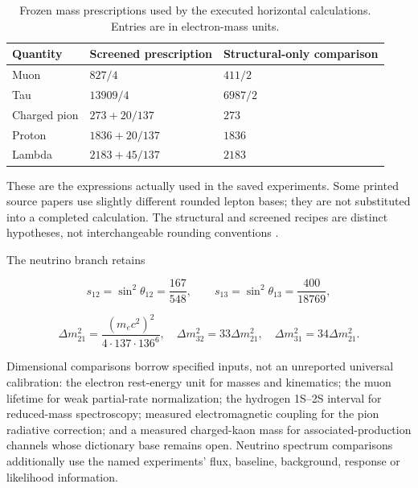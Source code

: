 \documentclass[11pt,a4paper]{article}
\begin{document}
\begin{table}[htbp]\centering
\caption{Frozen mass prescriptions used by the executed horizontal calculations. Entries are in electron-mass units.}\label{tab:dictionary}
\small\setlength{\tabcolsep}{5pt}\renewcommand{\arraystretch}{1.15}
\begin{tabular}{@{}lll@{}}

\toprule\noalign{}
Quantity & Screened prescription & Structural-only comparison \\
\midrule\noalign{}

Muon & \(827/4\) & \(411/2\) \\
Tau & \(13909/4\) & \(6987/2\) \\
Charged pion & \(273+20/137\) & \(273\) \\
Proton & \(1836+20/137\) & \(1836\) \\
Lambda & \(2183+45/137\) & \(2183\) \\
\bottomrule
\end{tabular}
\end{table}

These are the expressions actually used in the saved experiments. Some printed source papers use slightly different rounded lepton bases; they are not substituted into a completed calculation. The structural and screened recipes are distinct hypotheses, not interchangeable rounding conventions \cite{D3,D4,D5,R17,R18,R19,R20,R21,R22,R23}.

The neutrino branch retains

\begin{equation}\label{eq:6}
s_{12}=\sin^2\theta_{12}=\frac{167}{548},\qquad
s_{13}=\sin^2\theta_{13}=\frac{400}{18769},
\end{equation}

\begin{equation}\label{eq:7}
\Delta m_{21}^2=\frac{(m_ec^2)^2}{4\cdot137\cdot136^6},\quad
\Delta m_{32}^2=33\Delta m_{21}^2,\quad
\Delta m_{31}^2=34\Delta m_{21}^2.
\end{equation}

Dimensional comparisons borrow specified inputs, not an unreported universal calibration: the electron rest-energy unit for masses and kinematics; the muon lifetime for weak partial-rate normalization; the hydrogen 1S--2S interval for reduced-mass spectroscopy; measured electromagnetic coupling for the pion radiative correction; and a measured charged-kaon mass for associated-production channels whose dictionary base remains open. Neutrino spectrum comparisons additionally use the named experiments' flux, baseline, background, response or likelihood information.
\end{document}
